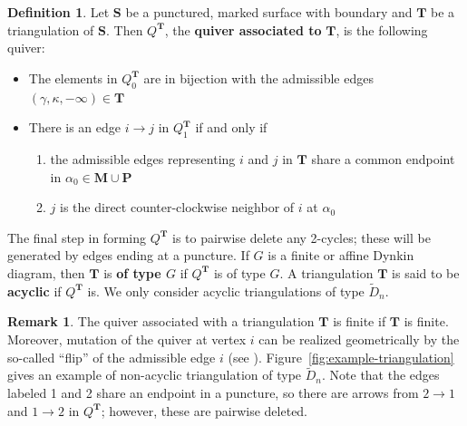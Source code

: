 \documentclass[11pt]{amsart}
\theoremstyle{plain}
\theoremstyle{definition}
\newtheorem{definition}[theorem]{Definition}
\newtheorem{remark}[theorem]{Remark}
\numberwithin{equation}{section}
\def\surf{\mathbf{S}}                       %
\def\TT{\mathbf{T}}
\def\PP{\mathbf{P}}
\def\MM{\mathbf{M}}
\begin{document}
\begin{definition}\label{def-qt}
    Let $\surf$ be a punctured, marked surface with boundary and $\TT$ be a triangulation of $\surf$. 
    Then $Q^\TT$, the \textbf{quiver associated to} $\TT$, is the following quiver:
    \begin{itemize}
        \item The elements in $Q_0^\TT$ are in bijection with the admissible edges $(\gamma,\kappa, -\infty) \in \TT$
        \item There is an edge $i \to j$ in $Q_1^\TT$ if and only if 
        \begin{enumerate}
            \item the admissible edges representing $i$ and $j$ in $\TT$ share a common endpoint in $\alpha_0 \in \MM \cup \PP$
            \item $j$ is the direct counter-clockwise neighbor of $i$ at $\alpha_0$
        \end{enumerate}
    \end{itemize}
    The final step in forming $Q^\TT$ is to pairwise delete any 2-cycles; these will be generated by edges ending at a puncture.
    If $G$ is a finite or affine Dynkin diagram, then $\TT$ is \textbf{of type $G$} if $Q^\TT$ is of type $G$. 
    A triangulation $\TT$ is said to be \textbf{acyclic} if $Q^\TT$ is. 
    We only consider acyclic triangulations of type $\widetilde{D}_n$.
\end{definition}

\begin{remark}
    The quiver associated with a triangulation $\TT$ is finite if $\TT$ is finite.
    Moreover, mutation of the quiver at vertex $i$ can be realized geometrically by the so-called ``flip'' of the admissible edge $i$ (see \cite{fomin_cluster_2008}). 
    Figure~\ref{fig:example-triangulation} gives an example of non-acyclic triangulation of type $\widetilde{D}_n$.
    Note that the edges labeled 1 and 2 share an endpoint in a puncture, so there are arrows from $2 \to 1$ and $1 \to 2$ in $Q^\TT$; however, these are pairwise deleted.
\end{remark}
\end{document}
